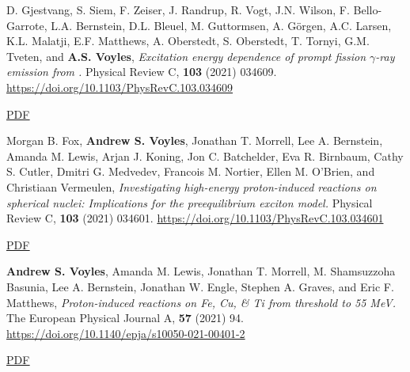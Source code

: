 \begin{bibsection}
\item D. Gjestvang, S. Siem, F. Zeiser, J. Randrup, R. Vogt, J.N. Wilson, F. Bello-Garrote, L.A. Bernstein, D.L. Bleuel, M. Guttormsen, A. Görgen, A.C. Larsen, K.L. Malatji, E.F. Matthews, A. Oberstedt, S. Oberstedt, T. Tornyi, G.M. Tveten, and \textbf{A.S. Voyles}, \emph{Excitation energy dependence of prompt fission $\gamma$-ray emission from  .} Physical Review C, \textbf{103} (2021) 034609. \url{https://doi.org/10.1103/PhysRevC.103.034609}

\ifshort \vspace{0.1cm} \href{https://avoyles.github.io/papers/Gjestvang2021_241Pu.pdf}{\underline{PDF}} \else  \fi


\item Morgan B. Fox, \textbf{Andrew S. Voyles}, Jonathan T. Morrell, Lee A. Bernstein, Amanda M. Lewis, Arjan J. Koning, Jon C. Batchelder, Eva R. Birnbaum, Cathy S. Cutler, Dmitri G. Medvedev, Francois M. Nortier, Ellen M. O’Brien, and Christiaan Vermeulen, \emph{Investigating high-energy proton-induced reactions on spherical nuclei: Implications for the preequilibrium exciton model.} Physical Review C, \textbf{103} (2021) 034601. \url{https://doi.org/10.1103/PhysRevC.103.034601}

\ifshort \vspace{0.1cm} \href{https://avoyles.github.io/papers/Fox2021_Nb.pdf}{\underline{PDF}} \else  \fi


\item \textbf{Andrew S. Voyles}, Amanda M. Lewis, Jonathan T. Morrell, M. Shamsuzzoha Basunia, Lee A. Bernstein, Jonathan W. Engle, Stephen A. Graves, and Eric F. Matthews, \emph{Proton-induced reactions on Fe, Cu, \& Ti from threshold to 55 MeV.} The European Physical Journal A, \textbf{57} (2021) 94. \url{https://doi.org/10.1140/epja/s10050-021-00401-2}

\ifshort \vspace{0.1cm} \href{https://avoyles.github.io/papers/Voyles2021_Fe_px.pdf}{\underline{PDF}} \else  \fi



\end{bibsection}
